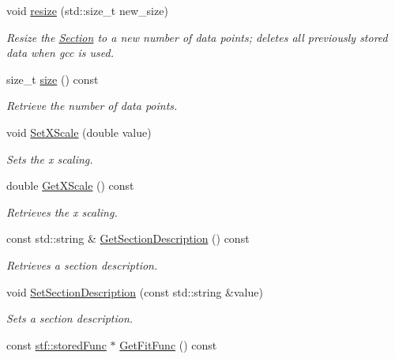 \begin{DoxyCompactItemize}
void \hyperlink{classSection_a6c1d862be679b440e8e5c4536321ad63}{resize} (std::size\_\-t new\_\-size)
\begin{DoxyCompactList}\small\item\em Resize the \hyperlink{classSection}{Section} to a new number of data points; deletes all previously stored data when gcc is used. \item\end{DoxyCompactList}\item 
size\_\-t \hyperlink{classSection_a2bbdfd756c4a51191944b6acb4e730c6}{size} () const 
\begin{DoxyCompactList}\small\item\em Retrieve the number of data points. \item\end{DoxyCompactList}\item 
void \hyperlink{classSection_a2fd59487e56778a833548e68150d1d76}{SetXScale} (double value)
\begin{DoxyCompactList}\small\item\em Sets the x scaling. \item\end{DoxyCompactList}\item 
double \hyperlink{classSection_abefdeba1385a91ed8d151df70deacd00}{GetXScale} () const 
\begin{DoxyCompactList}\small\item\em Retrieves the x scaling. \item\end{DoxyCompactList}\item 
const std::string \& \hyperlink{classSection_a5ca59050bebcc8fb05ae4aa8b795c0c5}{GetSectionDescription} () const 
\begin{DoxyCompactList}\small\item\em Retrieves a section description. \item\end{DoxyCompactList}\item 
void \hyperlink{classSection_a187071317155567ebbb249de9657aca3}{SetSectionDescription} (const std::string \&value)
\begin{DoxyCompactList}\small\item\em Sets a section description. \item\end{DoxyCompactList}\item 
const \hyperlink{structstf_1_1storedFunc}{stf::storedFunc} $\ast$ \hyperlink{classSection_ad4867f096b0fa9bcbfd1793bb002a1b9}{GetFitFunc} () const 

\end{DoxyCompactItemize}
